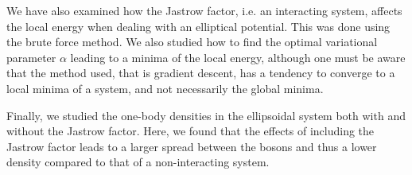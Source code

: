 \documentclass[
    a4paper, aps, twocolumn, floatfix, superscriptaddress,
    nofootinbib]{revtex4-1}
\begin{document}
 We have also examined how the Jastrow factor, i.e. an interacting system, affects the local energy when dealing with an elliptical potential. This was done using the brute force method. We also studied how to find the optimal variational parameter $\alpha$ leading to a minima of the local energy, although one must be aware that the method used, that is gradient descent, has a tendency to converge to a local minima of a system, and not necessarily the global minima.
 
 Finally, we studied the one-body densities in the ellipsoidal system both with and without the Jastrow factor. Here, we found that the effects of including the Jastrow factor leads to a larger spread between the bosons and thus a lower density compared to that of a non-interacting system.

\begin{table}[H]

\caption{Local energy as a function of $\alpha$ when running the brute force algorithm for $N = 10$, 50 and 100 particles in 3 dimensions. This is done with $2^{17}$ steps for $N=10, 50$, whereas the computation for $N=100$ is done with $2^{16}$ steps. All is run with a step length 0.1.}
\label{tab:e_brute_force_localE_stepLength_0.1}
\centering
{}
\end{table}
\end{document}
